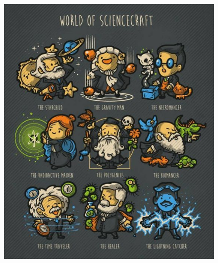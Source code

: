 \documentclass[
	12pt,				%
	openright,			%
	twoside,			%
	a4paper,			%
	english,			%
	french,				%
	spanish,			%
	brazil,				%
	]{abntex2}
\begin{document}
\newpage

\begin{figure}
	\centering
	\includegraphics[width=0.85\linewidth, height=0.65\linewidth]{mestres/mestres}
	\caption{}
	\label{fig:mestres}
\end{figure}
\end{document}
